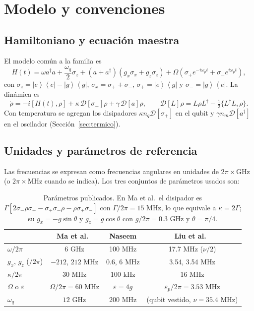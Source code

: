 \documentclass[11pt]{report}
\newcommand{\ket}[1]{\left|#1\right\rangle}
\newcommand{\bra}[1]{\left\langle#1\right|}
\newcommand{\spl}{\sigma_{+}}
\newcommand{\smi}{\sigma_{-}}
\newcommand{\Pe}{\ket{e}\!\bra{e}}
\newcommand{\Pg}{\ket{g}\!\bra{g}}
\newcommand{\D}{\mathcal{D}}
\begin{document}
\section{Modelo y convenciones}

\subsection{Hamiltoniano y ecuaci\'on maestra}

El modelo com\'un a la familia es
\begin{equation}
H(t)=\omega a^{\dagger}a+\frac{\omega_{q}}{2}\sigma_{z}+(a+a^{\dagger})\left(g_{x}\sigma_{x}+g_{z}\sigma_{z}\right)+\Omega\left(\spl e^{-i\omega_{p}t}+\smi e^{i\omega_{p}t}\right),
\label{eq:H}
\end{equation}
con $\sigma_{z}=\Pe-\Pg$, $\sigma_{x}=\spl+\smi$, $\spl=\ket{e}\bra{g}$ y $\smi=\ket{g}\bra{e}$. La din\'amica es
\begin{equation}
\dot\rho=-i[H(t),\rho]+\kappa\,\D[\smi]\rho+\gamma\,\D[a]\rho,\qquad \D[L]\rho=L\rho L^{\dagger}-\tfrac{1}{2}\{L^{\dagger}L,\rho\}.
\label{eq:ME}
\end{equation}
Con temperatura se agregan los disipadores $\kappa n_{q}\D[\spl]$ en el qubit y $\gamma n_{m}\D[a^{\dagger}]$ en el oscilador (Secci\'on~\ref{sec:termico}).

\subsection{Unidades y par\'ametros de referencia}

Las frecuencias se expresan como frecuencias angulares en unidades de $2\pi\times$GHz (o $2\pi\times$MHz cuando se indica). Los tres conjuntos de par\'ametros usados son:

\begin{table}[h]
\centering
\begin{tabular}{lccc}
\toprule
 & Ma et al.\ \cite{Ma2019} & Naseem \cite{Naseem2026} & Liu et al.\ \cite{Liu2025}\\
\midrule
$\omega/2\pi$ & 6 GHz & 100 MHz & 17.7 MHz ($\nu/2$)\\
$g_{x}$, $g_{z}$ ($/2\pi$) & $-212$, $212$ MHz & 0.6, 6 MHz & 3.54, 3.54 MHz\\
$\kappa/2\pi$ & 30 MHz & 100 kHz & 16 MHz\\
$\Omega$ o $\varepsilon$ & $\Omega/2\pi=60$ MHz & $\varepsilon=4g$ & $\varepsilon_{p}/2\pi=3.53$ MHz\\
$\omega_{q}$ & $12$ GHz & $200$ MHz & (qubit vestido, $\nu=35.4$ MHz)\\
\bottomrule
\end{tabular}
\caption{Par\'ametros publicados. En Ma et al.\ el disipador es $\Gamma[2\smi\rho\spl-\spl\smi\rho-\rho\spl\smi]$ con $\Gamma/2\pi=15$ MHz, lo que equivale a $\kappa=2\Gamma$; su $g_{x}=-g\sin\theta$ y $g_{z}=g\cos\theta$ con $g/2\pi=0.3$ GHz y $\theta=\pi/4$.}
\end{table}
\end{document}
